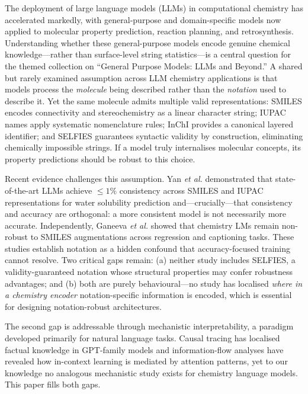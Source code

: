 \documentclass[twoside,twocolumn,9pt]{article}
\begin{document}
The deployment of large language models (LLMs) in computational chemistry has accelerated markedly, with general-purpose and domain-specific models now applied to molecular property prediction, reaction planning, and retrosynthesis.\cite{bran2024,white2023,jablonka2024,jablonka2024predictive} Understanding whether these general-purpose models encode genuine chemical knowledge---rather than surface-level string statistics---is a central question for the themed collection on ``General Purpose Models: LLMs and Beyond.'' A shared but rarely examined assumption across LLM chemistry applications is that models process the \textit{molecule} being described rather than the \textit{notation} used to describe it. Yet the same molecule admits multiple valid representations: SMILES\cite{weininger1988} encodes connectivity and stereochemistry as a linear character string; IUPAC names apply systematic nomenclature rules; InChI\cite{heller2015} provides a canonical layered identifier; and SELFIES\cite{krenn2020} guarantees syntactic validity by construction, eliminating chemically impossible strings. If a model truly internalises molecular concepts, its property predictions should be robust to this choice.

Recent evidence challenges this assumption. Yan \textit{et al.}\cite{yan2025} demonstrated that state-of-the-art LLMs achieve $\leq1\%$ consistency across SMILES and IUPAC representations for water solubility prediction and---crucially---that consistency and accuracy are orthogonal: a more consistent model is not necessarily more accurate. Independently, Ganeeva \textit{et al.}\cite{ganeeva2025} showed that chemistry LMs remain non-robust to SMILES augmentations across regression and captioning tasks. These studies establish notation as a hidden confound that accuracy-focused training cannot resolve. Two critical gaps remain: (a) neither study includes SELFIES, a validity-guaranteed notation whose structural properties may confer robustness advantages; and (b) both are purely behavioural---no study has localised \textit{where in a chemistry encoder} notation-specific information is encoded, which is essential for designing notation-robust architectures.

The second gap is addressable through mechanistic interpretability, a paradigm developed primarily for natural language tasks. Causal tracing has localised factual knowledge in GPT-family models\cite{meng2022} and information-flow analyses have revealed how in-context learning is mediated by attention patterns,\cite{wang2023} yet to our knowledge no analogous mechanistic study exists for chemistry language models. This paper fills both gaps.
\end{document}
